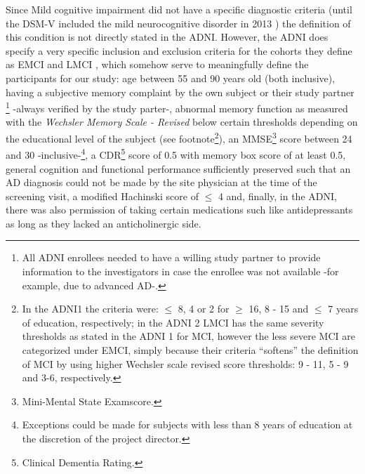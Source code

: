 \documentclass[a4paper,12pt]{elsarticle}  %
\begin{document}
	 
	 Since Mild cognitive impairment did not have a specific diagnostic criteria (until the DSM-V included the mild neurocognitive disorder in 2013 \cite{DSM-V-GOOGLESCHOLAR-CITARMILLOR}) the definition of this condition is not directly stated in the ADNI. However, the ADNI does specify a very specific inclusion and exclusion criteria for the cohorts they define as EMCI and LMCI \cite{adni1_protocol_extension, adni2_protocol_extension}, which somehow serve to meaningfully define the participants for our study: age between 55 and 90 years old (both inclusive), having a subjective memory complaint by the own subject or their study partner \footnote{All ADNI enrollees needed to have a willing study partner to provide information to the investigators in case the enrollee was not available -for example, due to advanced AD-.} -always verified by the study parter-, abnormal memory function as measured with the \textit{Wechsler Memory Scale - Revised} below certain thresholds depending on the educational level of the subject (see footnote\footnote{In the ADNI1 the criteria were\cite{adni1_protocol_extension}: $\leq$ 8, 4 or 2 for $\geq$ 16, 8 - 15 and $\leq$ 7 years of education, respectively; in the ADNI 2 LMCI has the same severity thresholds as stated in the ADNI 1 for MCI, however the less severe MCI are categorized under EMCI, simply because their criteria ``softens'' the definition of MCI by using higher Wechsler scale revised score thresholds: 9 - 11, 5 - 9 and 3-6, respectively\cite{adni2_protocol_extension}.}), an MMSE\footnote{Mini-Mental State Examscore.} score between 24 and 30 -inclusive-\footnote{Exceptions could be made for subjects with less than 8 years of education at the
	discretion of the project director.}, a CDR\footnote{Clinical Dementia Rating.} score of 0.5 with memory box score of at least 0.5, general cognition and functional performance sufficiently preserved such that an AD diagnosis could not be made by the site physician at the time of the screening visit, a modified Hachinski score of $\leq$ 4 and, finally, in the ADNI, there was also permission of taking certain medications such like antidepressants as long as they lacked an anticholinergic side. 
	
	\clearpage
	
	
	
\end{document}
